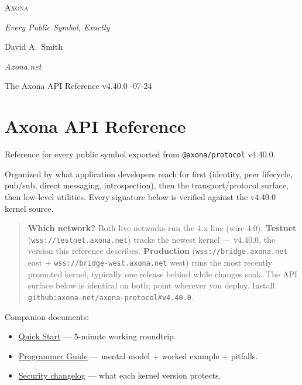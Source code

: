 \documentclass[
  nobib]{tufte-handout}
\author{}
\date{}
\providecommand{\tightlist}{%
  \setlength{\itemsep}{0pt}\setlength{\parskip}{0pt}}
\begin{document}
\thispagestyle{empty}
\null\vfill
\begin{center}
{\fontsize{48}{52}\selectfont \textsc{Axona}\par}
\vspace{0.6em}
{\Large\itshape Every Public Symbol, Exactly\par}
\vspace{4em}
{\large David A.~Smith\par}
{\itshape\small Axona.net\par}
\vspace{2em}
{\small The Axona API Reference \quad v4.40.0 -07-24\par}
\end{center}
\vfill
\null
\newpage
\pagestyle{ndhtplain}
\thispagestyle{ndhtplain}
\setcounter{page}{1}

\section{Axona API Reference}\label{axona-api-reference}

Reference for every public symbol exported from \texttt{@axona/protocol}
v4.40.0.

Organized by what application developers reach for first (identity, peer
lifecycle, pub/sub, direct messaging, introspection), then the
transport/protocol surface, then low-level utilities. Every signature
below is verified against the v4.40.0 kernel source.

\begin{quote}
\textbf{Which network?} Both live networks run the 4.x line (wire 4.0).
\textbf{Testnet} (\texttt{wss://testnet.axona.net}) tracks the newest
kernel --- v4.40.0, the version this reference describes.
\textbf{Production} (\texttt{wss://bridge.axona.net} east +
\texttt{wss://bridge-west.axona.net} west) runs the most recently
promoted kernel, typically one release behind while changes soak. The
API surface below is identical on both; point wherever you deploy.
Install \texttt{github:axona-net/axona-protocol\#v4.40.0}.
\end{quote}

Companion documents:

\begin{itemize}
\tightlist
\item
  \href{Quick-Start-v4.40.0.md}{Quick Start} --- 5-minute working
  roundtrip.
\item
  \href{Axona-Programmer-Guide-v4.38.0.md}{Programmer Guide} --- mental
  model + worked example + pitfalls.
\item
  \href{../SECURITY-CHANGELOG.md}{Security changelog} --- what each
  kernel version protects.
\end{itemize}
\end{document}

